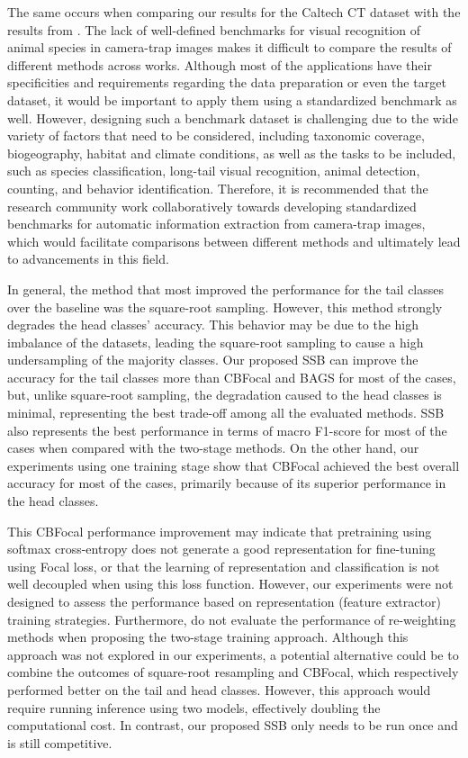 The
same occurs when comparing our results for the Caltech CT dataset with the
results from \citet{beery2018recognition}. The lack of well-defined benchmarks
for visual recognition of animal species in camera-trap images makes it
difficult to compare the results of different methods across works. Although
most of the applications have their specificities and requirements regarding the
data preparation or even the target dataset, it would be important to apply them
using a standardized benchmark as well. However, designing such a benchmark
dataset is challenging due to the wide variety of factors that need to be
considered, including taxonomic coverage, biogeography, habitat and climate
conditions, as well as the tasks to be included, such as species classification,
long-tail visual recognition, animal detection, counting, and behavior
identification. Therefore, it is recommended that the research community work
collaboratively towards developing standardized benchmarks for automatic
information extraction from camera-trap images, which would facilitate
comparisons between different methods and ultimately lead to advancements in
this field.

In general, the method that most improved the performance for the tail classes
over the baseline was the square-root sampling. However, this method strongly
degrades the head classes’ accuracy. This behavior may be due to the high
imbalance of the datasets, leading the square-root sampling to cause a high
undersampling of the majority classes. Our proposed SSB can improve the accuracy
for the tail classes more than CBFocal and BAGS for most of the cases, but,
unlike square-root sampling, the degradation caused to the head classes is
minimal, representing the best trade-off among all the evaluated methods. SSB
also represents the best performance in terms of macro F1-score for most of the
cases when compared with the two-stage methods. On the other hand, our
experiments using one training stage show that CBFocal achieved the best overall
accuracy for most of the cases, primarily because of its superior performance in
the head classes. 

This CBFocal performance improvement may indicate that
pretraining using softmax cross-entropy does not generate a good representation
for fine-tuning using Focal loss, or that the learning of representation and
classification is not well decoupled when using this loss function. However, our
experiments were not designed to assess the performance based on representation
(feature extractor) training strategies. Furthermore, \citet{Kang2020Decoupling}
do not evaluate the performance of re-weighting methods when proposing the
two-stage training approach. Although this approach was not explored in our
experiments, a potential alternative could be to combine the outcomes of
square-root resampling and CBFocal, which respectively performed better on the
tail and head classes. However, this approach would require running inference
using two models, effectively doubling the computational cost. In contrast, our
proposed SSB only needs to be run once and is still competitive.

